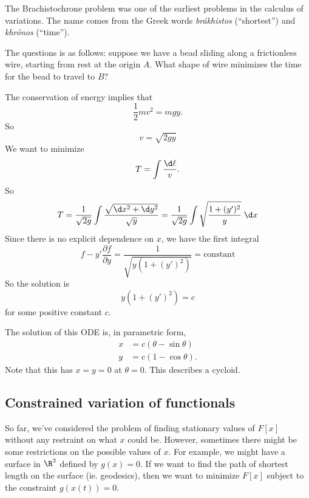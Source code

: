 \documentclass[a4paper]{article}
\begin{document}
\begin{eg}[Brachistochrone]
  The Brachistochrone problem was one of the earliest problems in the calculus of variations. The name comes from the Greek words \emph{br\'akhistos} (``shortest'') and \emph{khr\'onos} (``time'').

  The questions is as follows: suppose we have a bead sliding along a frictionless wire, starting from rest at the origin $A$. What shape of wire minimizes the time for the bead to travel to $B$?
  \begin{center}
  \end{center}
  The conservation of energy implies that
  \[
    \frac{1}{2}mv^2 = mgy.
  \]
  So
  \[
    v = \sqrt{2gy}
  \]
  We want to minimize
  \[
    T = \int \frac{\d \ell}{v}.
  \]
  So
  \[
    T = \frac{1}{\sqrt{2g}}\int \frac{\sqrt{\d x^2 + \d y^2}}{\sqrt{y}} = \frac{1}{\sqrt{2g}}\int \sqrt{\frac{1 + (y')^2}{y}}\;\d x
  \]
  Since there is no explicit dependence on $x$, we have the first integral
  \[
    f - y'\frac{\partial f}{\partial y} = \frac{1}{\sqrt{y(1 + (y')^2)}} = \text{constant}
  \]
  So the solution is
  \[
    y(1 + (y')^2) = c
  \]
  for some positive constant $c$.

  The solution of this ODE is, in parametric form,
  \begin{align*}
    x &= c(\theta - \sin \theta)\\
    y &= c(1 - \cos \theta).
  \end{align*}
  Note that this has $x = y = 0$ at $\theta = 0$. This describes a cycloid.
\end{eg}

\subsection{Constrained variation of functionals}
So far, we've considered the problem of finding stationary values of $F[x]$ without any restraint on what $x$ could be. However, sometimes there might be some restrictions on the possible values of $x$. For example, we might have a surface in $\R^3$ defined by $g(x) = 0$. If we want to find the path of shortest length on the surface (ie. geodesics), then we want to minimize $F[x]$ subject to the constraint $g(x(t)) = 0$.
\end{document}
